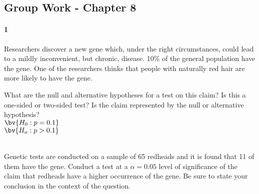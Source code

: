 \documentclass{article}
\begin{document}
\begin{flushleft}
\section*{Group Work - Chapter 8}
\paragraph{1} Researchers discover a new gene which, under the right circumstances, could lead to a mildly inconvenient, but chronic, disease. 10\% of the general population have the gene. One of the researchers thinks that people with naturally red hair are more likely to have the gene.
\begin{enumalpha}
\item What are the null and alternative hypotheses for a test on this claim? Is this a one-sided or two-sided test? Is the claim represented by the null or alternative hypothesis?\\
\medskip
$\bv{H_0: p = 0.1}$\\
$\bv{H_a: p > 0.1}$\\
\\
\vspace{.5in}
\item Genetic tests are conducted on a sample of 65 redheads and it is found that 11 of them have the gene. Conduct a test at a $\alpha = 0.05$ level of significance of the claim that redheads have a higher occurrence of the gene. Be sure to state your conclusion in the context of the question.\\
\medskip
{}
\end{enumalpha}



\newpage

\end{flushleft}
\end{document}
